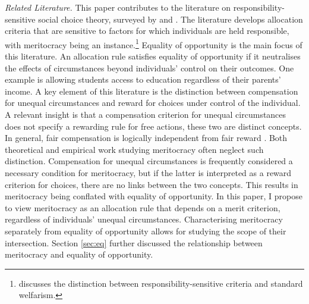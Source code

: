 \emph{Related Literature.} This paper contributes to the literature on responsibility-sensitive social choice theory, surveyed by \cite{fleurbaey2008fairness} and \cite{roemerEqualityOpportunityTheory2016}. The literature develops allocation criteria that are sensitive to factors for which individuals are held responsible, with meritocracy being an instance.\footnote{\cite{carrollEqualOpportunityDifferent2025} discusses the distinction between responsibility-sensitive criteria and standard welfarism.} Equality of opportunity is the main focus of this literature. An allocation rule satisfies equality of opportunity if it neutralises the effects of circumstances beyond individuals' control on their outcomes. One example is allowing students access to education regardless of their parents' income. A key element of this literature is the distinction between compensation for unequal circumstances and reward for choices under control of the individual. A relevant insight is that a compensation criterion for unequal circumstances does not specify a rewarding rule for free actions, these two are distinct concepts. In general, fair compensation is logically independent from fair reward \citep{moulinFairDivisionCollective2004}. Both theoretical and empirical work studying meritocracy often neglect such distinction. Compensation for unequal circumstances is frequently considered a necessary condition for meritocracy, but if the latter is interpreted as a reward criterion for choices, there are no links between the two concepts. This results in meritocracy being conflated with equality of opportunity. In this paper, I propose to view meritocracy as an allocation rule that depends on a merit criterion, regardless of individuals' unequal circumstances. Characterising meritocracy separately from equality of opportunity allows for studying the scope of their intersection. Section \ref{sec:eq} further discussed the relationship between meritocracy and equality of opportunity.


